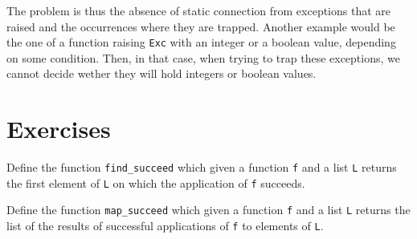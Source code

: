 The problem is thus the absence of static connection from exceptions
that are raised and the occurrences where they are trapped. Another
example would be the one of a function raising {\tt Exc} with an
integer or a boolean value, depending on some condition. Then, in that
case, when trying to trap these exceptions, we cannot decide wether
they will hold integers or boolean values.


\section*{Exercises}

\begin{exo}\label{Exc:1}
Define the function \verb"find_succeed" which given a function {\tt f} and a
list {\tt L} returns the first element of {\tt L} on which the application
of {\tt f} succeeds.
\end{exo}
\begin{exo}\label{Exc:2}
Define the function \verb"map_succeed" which given a function {\tt f} and a
list {\tt L} returns the list of the results of successful applications of
{\tt f} to elements of {\tt L}.
\end{exo}
